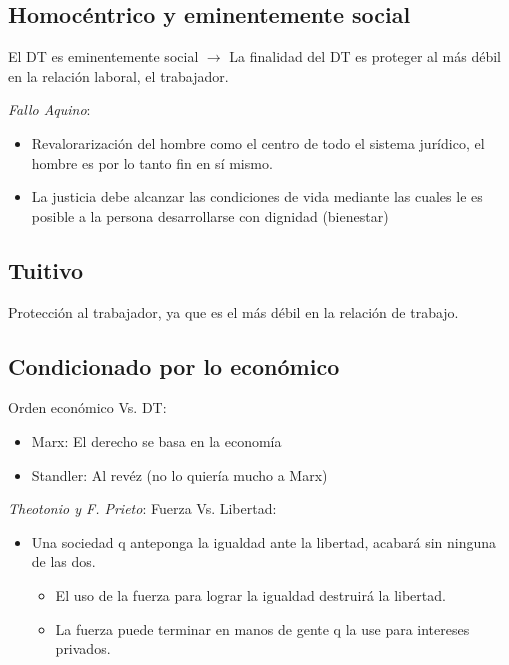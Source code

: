 \documentclass[spanish,12pt,a4paper,titlepage]{report}
\begin{document}
\subsection{Homocéntrico y eminentemente social}
\label{sec:homocentrico-y-eminentemente-social}

El DT es eminentemente social $\rightarrow$ La finalidad del DT es proteger al más débil en la relación laboral, el trabajador.

\textit{Fallo Aquino}:
\begin{itemize}
\item Revalorarización del hombre como el centro de todo el sistema jurídico, el hombre es por lo tanto fin en sí mismo.
\item La justicia debe alcanzar las condiciones de vida mediante las cuales le es posible a la persona desarrollarse con dignidad (bienestar)
\end{itemize}

\subsection{Tuitivo}
\label{sec:tuitivo}

Protección al trabajador, ya que es el más débil en la relación de trabajo.

\subsection{Condicionado por lo económico}
\label{sec:condicionado-por-lo-economico}

Orden económico Vs. DT:
\begin{itemize}
\item Marx: El derecho se basa en la economía
\item Standler: Al revéz (no lo quiería mucho a Marx)
\end{itemize}

\textit{Theotonio y F. Prieto}: Fuerza Vs. Libertad:
\begin{itemize}
\item Una sociedad q anteponga la igualdad ante la libertad, acabará sin ninguna de las dos.
  \begin{itemize}
  \item El uso de la fuerza para lograr la igualdad destruirá la libertad.
  \item La fuerza puede terminar en manos de gente q la use para intereses privados.
  \end{itemize}
\end{itemize}
\end{document}
